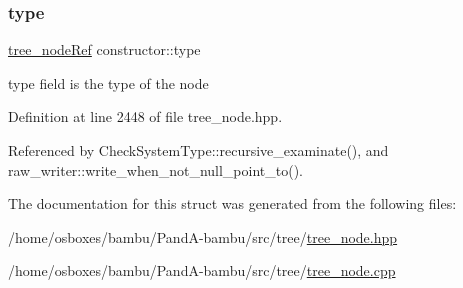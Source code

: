 \subsubsection{\texorpdfstring{type}{type}}
{\footnotesize\ttfamily \hyperlink{tree__node_8hpp_a6ee377554d1c4871ad66a337eaa67fd5}{tree\+\_\+node\+Ref} constructor\+::type}



type field is the type of the node 



Definition at line 2448 of file tree\+\_\+node.\+hpp.



Referenced by Check\+System\+Type\+::recursive\+\_\+examinate(), and raw\+\_\+writer\+::write\+\_\+when\+\_\+not\+\_\+null\+\_\+point\+\_\+to().



The documentation for this struct was generated from the following files\+:\begin{DoxyCompactItemize}
\item 
/home/osboxes/bambu/\+Pand\+A-\/bambu/src/tree/\hyperlink{tree__node_8hpp}{tree\+\_\+node.\+hpp}\item 
/home/osboxes/bambu/\+Pand\+A-\/bambu/src/tree/\hyperlink{tree__node_8cpp}{tree\+\_\+node.\+cpp}\end{DoxyCompactItemize}
